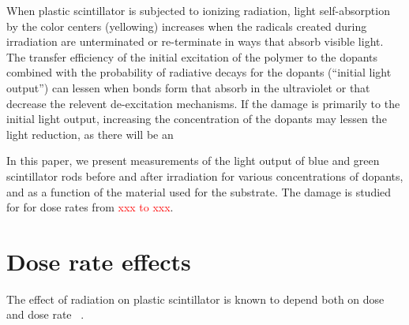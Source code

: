 \documentclass[review]{elsarticle}
\begin{document}
When plastic scintillator is subjected to ionizing radiation,
light self-absorption by the color centers (yellowing) increases when the radicals created during irradiation are unterminated or re-terminate in ways that absorb visible light.
The transfer efficiency of the initial excitation of the polymer to the
dopants combined with the probability of radiative decays for the dopants (``initial light output'') can lessen
when bonds form that absorb in the ultraviolet or that decrease the relevent de-excitation mechanisms.
If the damage is primarily to the initial light output, increasing the concentration 
of the dopants may lessen the light reduction, as there will be an 

In this paper, we present measurements of the light output 
of blue and green scintillator rods 
before and after irradiation for various concentrations of dopants, and
as a function of the material used for the substrate.
The damage is studied for 
for dose rates from \textcolor{red}{xxx to xxx}.


\section{Dose rate effects}

The effect of radiation on plastic scintillator is known to depend
both on dose and dose rate ~\cite{sauli,34504,Wick1991472,289295,173180,173178,Giokaris1993315,gillen,1748-0221-11-10-T10004}.  
\end{document}
